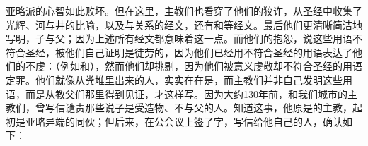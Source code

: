 亚略派的心智如此败坏。但在这里，主教们也看穿了他们的狡诈，从圣经中收集了光辉、河与井的比喻，以及与关系的经文，还有和等经文。最后他们更清晰简洁地写明，子与父；因为上述所有经文都意味着这一点。而他们的抱怨，说这些用语不符合圣经，被他们自己证明是徒劳的，因为他们已经用不符合圣经的用语表达了他们的不虔：（例如和），然而他们却挑剔，因为他们被意义虔敬却不符合圣经的用语定罪。他们就像从粪堆里出来的人，实实在在是，而主教们并非自己发明这些用语，而是从教父们那里得到见证，才这样写。因为大约130年前，和我们城市的主教们，曾写信谴责那些说子是受造物、不与父的人。知道这事，他原是的主教，起初是亚略异端的同伙；但后来，在公会议上签了字，写信给他自己的人，确认如下：\par

\par

